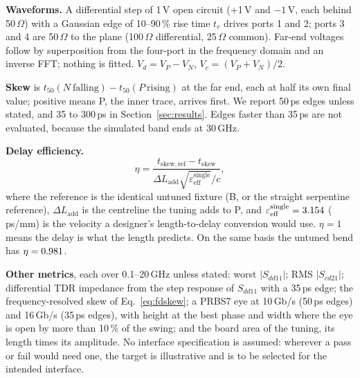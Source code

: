 \documentclass[10pt,twocolumn]{article}
\newcommand{\Sdd}[1]{S_{dd#1}}
\newcommand{\Scd}[1]{S_{cd#1}}
\newcommand{\eeff}{\varepsilon_{\mathrm{eff}}}
\begin{document}
\textbf{Waveforms.} A differential step of 1\,V open circuit (+1\,V and $-1$\,V, each behind 50\,$\Omega$) with a
Gaussian edge of 10--90\,\% rise time $t_r$ drives ports 1 and 2; ports 3 and 4 are 50\,$\Omega$ to the plane
(100\,$\Omega$ differential, 25\,$\Omega$ common). Far-end voltages follow by superposition from the four-port in
the frequency domain and an inverse FFT; nothing is fitted. $V_d = V_P - V_N$, $V_c = (V_P + V_N)/2$.

\textbf{Skew} is $t_{50}(N\ \text{falling}) - t_{50}(P\ \text{rising})$ at the far end, each at half its own final
value; positive means P, the inner trace, arrives first. We report 50\,ps edges unless stated, and 35 to 300\,ps
in Section~\ref{sec:results}. Edges faster than 35\,ps are not evaluated, because the simulated band ends at
30\,GHz.

\textbf{Delay efficiency.}
\begin{equation}
  \eta = \frac{t_\mathrm{skew,ref} - t_\mathrm{skew}}{\Delta L_\mathrm{add}\sqrt{\eeff^\mathrm{single}}/c},
  \label{eq:eta}
\end{equation}
where the reference is the identical untuned fixture (B, or the straight serpentine reference), $\Delta
L_\mathrm{add}$ is the centreline the tuning adds to P, and $\eeff^\mathrm{single} = \EpsSingle$
(\PsPerMm\,ps/mm) is the velocity a designer's length-to-delay conversion would use. $\eta = 1$ means the delay
is what the length predicts. On the same basis the untuned bend has $\eta = 0.981$.

\textbf{Other metrics}, each over 0.1--20\,GHz unless stated: worst $|\Sdd{11}|$; RMS $|\Scd{21}|$; differential
TDR impedance from the step response of $\Sdd{11}$ with a 35\,ps edge; the frequency-resolved skew of
Eq.~\eqref{eq:fdskew}; a PRBS7 eye at 10\,Gb/s (50\,ps edges) and 16\,Gb/s (35\,ps edges), with height at the
best phase and width where the eye is open by more than 10\,\% of the swing; and the board area of the tuning,
its length times its amplitude. No interface specification is assumed: wherever a pass or fail would need one, the
target is illustrative and is to be selected for the intended interface.

\begin{table}[t]
\centering
\caption{Metrics, medium mesh, 50\,ps edge. $\Delta L_\mathrm{add}$ is the centreline the tuning adds to P;
$\eta$ is Eq.~\eqref{eq:eta}; MTL is the line model's skew; $|\Sdd{11}|$ and $|\Scd{21}|$ over 0.1--20\,GHz;
$Z_\mathrm{diff}$ from TDR. Skew bounds: each variant's own GCI where it was solved on three meshes, else that of the converged variant
whose smallest features it shares (Section~\ref{sec:verification}).}
\label{tab:metrics}
\footnotesize
{}
\end{table}
\end{document}
